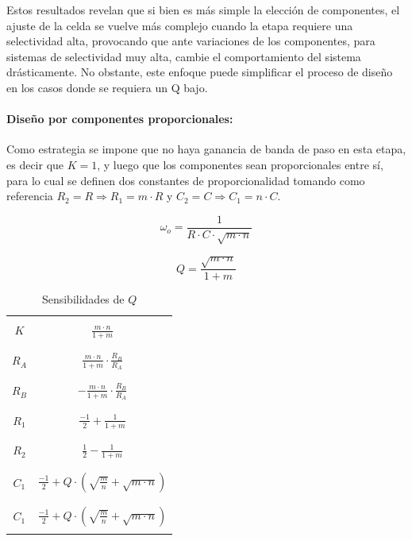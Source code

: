 Estos resultados revelan que si bien es m\'as simple la elecci\'on de componentes, el ajuste de la celda se vuelve m\'as complejo cuando la etapa requiere una selectividad alta,
provocando que ante variaciones de los componentes, para sistemas de selectividad muy alta, cambie el comportamiento del sistema dr\'asticamente. No obstante, este enfoque puede simplificar
el proceso de dise\~no en los casos donde se requiera un Q bajo.

\paragraph{Dise\~no por componentes proporcionales:} Como estrategia se impone que no haya ganancia de banda de paso en esta etapa, es decir que $K = 1$, y luego que los componentes sean proporcionales
entre s\'i, para lo cual se definen dos constantes de proporcionalidad tomando como referencia $R_2 = R \Rightarrow R_1 = m \cdot R$ y $C_2 = C \Rightarrow C_1 = n \cdot C$.

\begin{equation}
    \omega_o = \frac{1}{R \cdot C \cdot \sqrt{m \cdot n}}
    \label{eq:wo_ajuste_componentes_propocionales}
\end{equation}

\begin{equation}
    Q = \frac{\sqrt{m \cdot n}}{1 + m}
    \label{eq:q_ajuste_componentes_proporcionales}
\end{equation}


\begin{table}[H]
    \centering
    \begin{tabular}{c | c}
        \hline \\
        $K$ & $\frac{m \cdot n}{1 + m}$ \\
        \\ \hline \\
        $R_A$ & $\frac{m \cdot n}{1 + m} \cdot \frac{R_B}{R_A}$ \\
        \\ \hline \\
        $R_B$ & $- \frac{m \cdot n}{1 + m} \cdot \frac{R_B}{R_A}$ \\
        \\ \hline \\
        $R_1$ & $\frac{-1}{2} + \frac{1}{1 + m}$ \\
        \\ \hline \\
        $R_2$ & $\frac{1}{2} - \frac{1}{1 + m}$ \\
        \\ \hline \\
        $C_1$ & $\frac{-1}{2} + Q \cdot \left( \sqrt{\frac{m}{n}} + \sqrt{m \cdot n} \right)$ \\
        \\ \hline \\
        $C_1$ & $\frac{-1}{2} + Q \cdot \left( \sqrt{\frac{m}{n}} + \sqrt{m \cdot n} \right)$ \\
        \\ \hline
    \end{tabular}
    \caption{Sensibilidades de $Q$}
\end{table}

